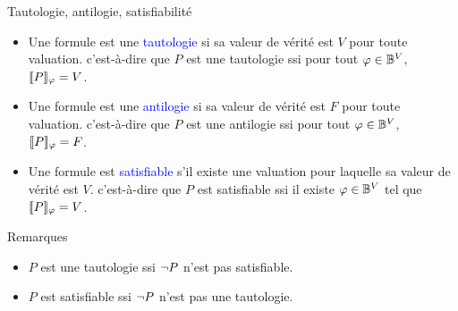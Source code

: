\documentclass[10pt]{beamer}
\begin{document}
\begin{frame}{\Ctitle}{\stitle}
	\begin{alertblock}{Tautologie, antilogie, satisfiabilité}
		\begin{itemize}
			\item Une formule est une \textcolor{blue}{tautologie} si sa valeur de vérité est $V$ pour toute valuation. c'est-à-dire que $P$ est une tautologie ssi pour tout $\varphi \in \mathbb{B}^V$, $\llbracket P \rrbracket_{\varphi} = V$.
			\item<2-> Une formule est une \textcolor{blue}{antilogie} si sa valeur de vérité est $F$ pour toute valuation. c'est-à-dire que $P$ est une antilogie ssi pour tout $\varphi \in \mathbb{B}^V$, $\llbracket P \rrbracket_{\varphi} = F$.
			\item<3-> Une formule est \textcolor{blue}{satisfiable} s'il existe une valuation pour laquelle sa valeur de vérité est $V$. c'est-à-dire que $P$ est satisfiable ssi il existe $\varphi \in \mathbb{B}^V$ tel que $\llbracket P \rrbracket_{\varphi} = V$.
		\end{itemize}
	\end{alertblock}
	{\begin{block}{Remarques}
			\begin{itemize}
				\item<4-> $P$ est une tautologie ssi $\neg P$ n'est pas satisfiable.
				\item<5-> $P$ est satisfiable ssi $\neg P$ n'est pas une tautologie.
			\end{itemize}
		\end{block}}
\end{frame}
\end{document}
